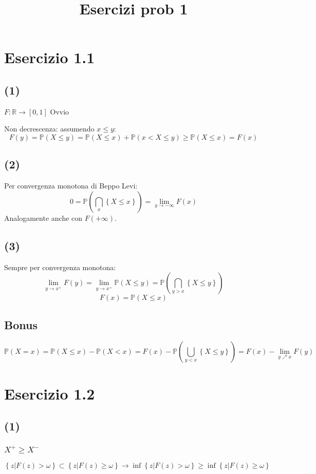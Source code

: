 \documentclass{article}
\title{Esercizi prob 1}
\begin{document}
\maketitle
\section{Esercizio 1.1}
\subsection{(1)}
$F: \mathbb{R}\rightarrow \left[0,1\right]$ Ovvio

Non decrescenza: assumendo $x\leq y$:
\[
	F(y)= \mathbb{P}\left(X\leq y\right) = \mathbb{P}\left(X\leq x\right)
	+ \mathbb{P}
	\left(x < X \leq y \right)
	\geq
	\mathbb{P}\left(X\leq x\right) = F(x)
\]

\subsection{(2)}
Per convergenza monotona di Beppo Levi:
\[
	0 = \mathbb{P}\left(\bigcap_x \left\{X\leq x\right\}\right) = \lim_{y\rightarrow -\infty} F(x)
\]
Analogamente anche con $F(+\infty)$.

\subsection{(3)}
Sempre per convergenza monotona:
\[
	\lim_{y\rightarrow x^+} F(y) = \lim_{y\rightarrow x^+}\mathbb{P}\left(X\leq y\right) = \mathbb{P} \left(\bigcap_{y>x}\left\{X\leq y\right\}\right)
\]
\[
	F(x) = \mathbb{P}\left(X\leq x\right)	
\]
\subsection{Bonus}
\[
	\mathbb{P}\left(X=x\right) = \mathbb{P}\left(X\leq x\right) - \mathbb{P}\left(X<x\right) = F(x) - \mathbb{P}\left(\bigcup_{y<x} \left\{X\leq y\right\}\right) = F(x) - \lim_{y \nearrow x} F(y)
\]


\section{Esercizio 1.2}
\subsection{(1)}
\subsubsection{$X^+ \geq X^-$}
\[
	\left\{z| F(z)>\omega \right\} \subset \left\{z| F(z) \geq \omega\right\} \longrightarrow \inf \left\{z| F(z)>\omega \right\} \geq \inf \left\{z| F(z) \geq \omega\right\} 
\]
\end{document}
